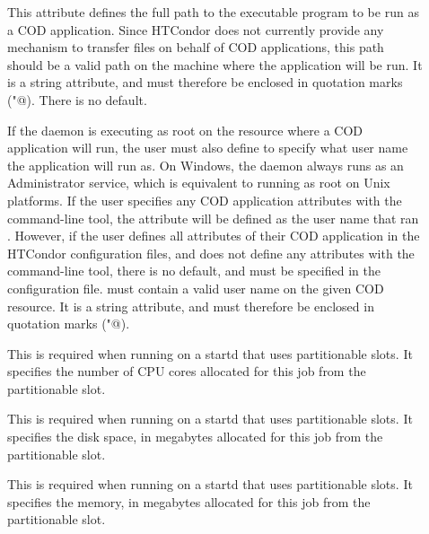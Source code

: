 \begin{description}

 \item[] This attribute 
   defines the full path to the executable program to be run as a
   COD application.
   Since HTCondor does not currently provide any mechanism to transfer
   files on behalf of COD applications, this path should be a valid
   path on the machine where the application will be run.
   It is a string attribute, and must therefore be enclosed in
   quotation marks (\verb@"@).
   There is no default.

 \item[] If the  daemon is executing as root on
   the resource where a COD application will run, the user must also
   define  to specify what user name the application will
   run as.
   On Windows, the  daemon always runs as an Administrator
   service, which is equivalent to running as root on Unix platforms.
   If the user specifies any COD application attributes with the
     command-line tool, the 
   attribute will be defined as the user name that ran
    .
   However, if the user defines all attributes of their COD
   application in the HTCondor configuration files, and does not define
   any attributes with the   command-line tool,
   there is no default,
    and  must be specified in the configuration file.
    must contain a valid user
   name on the given COD resource. 
   It is a string attribute, and must therefore be enclosed in 
   quotation marks (\verb@"@).

 \item[] This is required when running on a startd
that uses partitionable slots.  It specifies the number of CPU cores
allocated for this job from the partitionable slot.

 \item[] This is required when running on a startd
that uses partitionable slots.  It specifies the disk space, in megabytes
allocated for this job from the partitionable slot.

 \item[] This is required when running on a startd
that uses partitionable slots.  It specifies the memory, in megabytes
allocated for this job from the partitionable slot.


\end{description}

